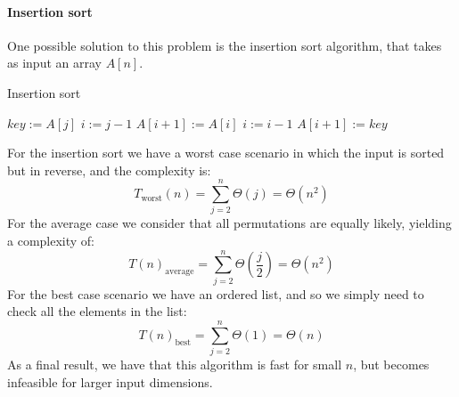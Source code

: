 \paragraph*{Insertion sort}
One possible solution to this problem is the insertion sort algorithm, that takes as input an array $A[n]$.  
\begin{algorithm}[H]
    \caption{Insertion sort}
        \begin{algorithmic}[1]
                \State $key := A[j]$
                \State $i := j-1$
                    \State $A[i+1] := A[i]$
                    \State $i := i - 1$
                \EndWhile
                \State $A[i+1] := key$
            \EndFor
        \end{algorithmic}
\end{algorithm}
For the insertion sort we have a worst case scenario in which the input is sorted but in reverse, and the complexity is: 
\[T_{\text{worst}}(n)=\sum_{j=2}^n\Theta(j)=\Theta(n^2)\]
For the average case we consider that all permutations are equally likely, yielding a complexity of: 
\[T(n)_{\text{average}}=\sum_{j=2}^n\Theta\left(\dfrac{j}{2}\right)=\Theta(n^2)\]
For the best case scenario we have an ordered list, and so we simply need to check all the elements in the list: 
\[T(n)_{\text{best}}=\sum_{j=2}^n\Theta\left(1\right)=\Theta(n)\]
As a final result, we have that this algorithm is fast for small $n$, but becomes infeasible for larger input dimensions. 